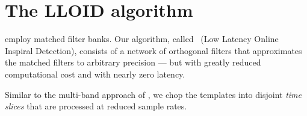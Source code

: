\documentclass[portrait,plainboxedsections]{sciposter}
\begin{document}
\begin{minipage}[t]{0.4\textwidth}

\section*{The LLOID algorithm}

 employ matched
filter banks.
Our algorithm, called \lloid{}~(Low Latency Online Inspiral Detection),
consists of a network of orthogonal filters that approximates the matched filters to arbitrary
precision --- but with greatly reduced computational cost and with nearly zero latency.

{
\setlength{\parindent}{1em}

Similar to the multi-band approach of \citet{Buskulic2010}, we chop the templates into
disjoint \emph{time slices} that are processed at reduced sample rates.

}
\end{minipage}
\end{document}
